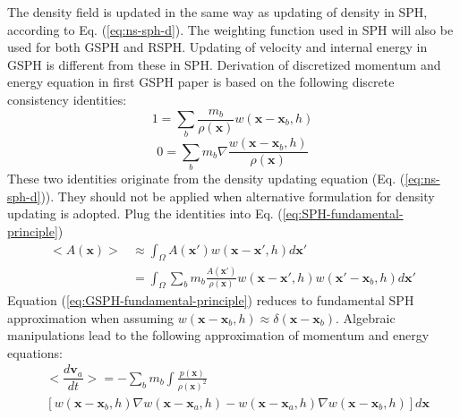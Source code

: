 The density field is updated in the same way as updating of density in SPH, according to Eq. (\ref{eq:ns-sph-d}). The weighting function used in SPH will also be used for both GSPH and RSPH. Updating of velocity and internal energy in GSPH is different from these in SPH.
Derivation of discretized momentum and energy equation in first GSPH paper \citep{inutsuka2002reformulation} is based on the following discrete consistency identities: 
\begin{equation}
1=\sum_{b} \frac{m_{b}}{\rho(\textbf{x})}w(\textbf{x} - \textbf{x}_{b}, h)
\label{eq:GSPH-basic1}
\end{equation}
\begin{equation}
0=\sum_{b} m_{b} \nabla \frac{w(\textbf{x} - \textbf{x}_{b}, h)}{\rho(\textbf{x})}
\label{eq:GSPH-basic2}
\end{equation}
These two identities originate from the density updating equation (Eq. (\ref{eq:ns-sph-d})). They should not be applied when alternative formulation for density updating is adopted.
Plug the identities into Eq. (\ref{eq:SPH-fundamental-principle})
\begin{equation}
\begin{split}
<A\left(\textbf{x}\right)> 
& \approx \int_{\Omega} A\left(\textbf{x} \prime\right) w\left(\textbf{x}-\textbf{x}\prime, h\right) d\textbf{x}\prime \\
& = \int_{\Omega}  \sum_{b} m_{b} \frac{A\left(\textbf{x} \prime\right)}{\rho(\textbf{x})} w\left(\textbf{x}-\textbf{x}\prime, h\right) w(\textbf{x}\prime - \textbf{x}_{b}, h) d\textbf{x}\prime
\end{split}
\label{eq:GSPH-fundamental-principle}
\end{equation}
Equation (\ref{eq:GSPH-fundamental-principle}) reduces to fundamental SPH approximation when assuming $w(\textbf{x} - \textbf{x}_{b}, h) \approx \delta (\textbf{x} - \textbf{x}_{b})$. 
Algebraic manipulations \citep{inutsuka2002reformulation,iwasaki2011smoothed} lead to the following approximation of momentum and energy equations:
\begin{equation}
\begin{split}
&<\dfrac{d \textbf{v}_{a}}{dt}> =-\sum_{b} m_{b} \int \frac{p(\textbf{x})}{\rho(\textbf{x})^2} \\
&\left[w(\textbf{x} - \textbf{x}_b, h) \nabla w(\textbf{x} - \textbf{x}_a, h) - w(\textbf{x} - \textbf{x}_a, h) \nabla w(\textbf{x} - \textbf{x}_b, h)\right] d\textbf{x} 
\end{split}
\label{eq:gov-gsph-v-approx}
\end{equation}
